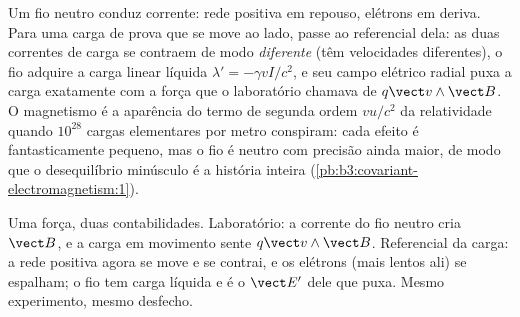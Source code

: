 \begin{example}\label{ex:b3:covariant-electromagnetism:wire}
Um fio neutro conduz corrente: rede positiva em repouso, elétrons em
deriva. Para uma carga de prova que se move ao lado, passe ao
referencial dela: as duas correntes de carga se contraem de modo
\emph{diferente} (têm velocidades diferentes), o fio adquire a carga
linear líquida $\lambda' =
-\gamma vI/c^2$, e seu campo elétrico radial puxa a carga exatamente
com a força que o laboratório chamava de $q\vect v\wedge\vect B$. O
magnetismo é a aparência do termo de segunda ordem $v u/c^2$ da
relatividade quando $10^{28}$ cargas elementares por metro conspiram:
cada efeito é fantasticamente pequeno, mas o fio é neutro com precisão
ainda maior, de modo que o desequilíbrio minúsculo é a história inteira
(\cref{pb:b3:covariant-electromagnetism:1}).
\end{example}

\begin{omfigure}

{\small Uma força, duas contabilidades. Laboratório: a corrente do fio
neutro cria $\vect B$, e a carga em movimento sente
$q\vect v\wedge\vect B$. Referencial da carga: a rede positiva agora se
move e se contrai, e os elétrons (mais lentos ali) se espalham; o fio
tem carga líquida e é o $\vect E'$ dele que puxa. Mesmo experimento,
mesmo desfecho.}
\end{omfigure}

